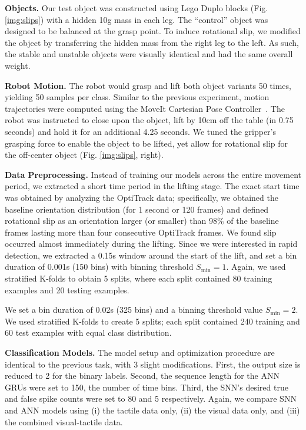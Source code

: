 \documentclass[fyp]{socreport}
\begin{document}
\noindent\textbf{Objects.} Our test object was constructed using Lego Duplo
blocks (Fig. \ref{img:slips}) with a hidden 10g mass in each leg. The
``control'' object was designed to be balanced at the grasp point. To induce
rotational slip, we modified the object by transferring the hidden mass from the
right leg to the left. As such, the stable and unstable objects were visually
identical and had the same overall weight.

\vspace{0.3em}
\noindent\textbf{Robot Motion.} The robot would grasp and lift both object
variants 50 times, yielding 50 samples per class. Similar to the previous
experiment, motion trajectories were computed using the MoveIt Cartesian Pose
Controller~\cite{coleman2014reducing}. The robot was instructed to close upon
the object, lift by 10cm off the table (in 0.75 seconds) and hold it for an
additional 4.25 seconds. We tuned the gripper's grasping force to enable the
object to be lifted, yet allow for rotational slip for the off-center object
(Fig. \ref{img:slips}, right).

\vspace{0.3em}
\noindent\textbf{Data Preprocessing.} Instead of training our models across the
entire movement period, we extracted a short time period in the lifting stage.
The exact start time was obtained by analyzing the OptiTrack data; specifically,
we obtained the baseline orientation distribution (for 1 second or 120 frames)
and defined rotational slip as an orientation larger (or smaller) than 98\% of
the baseline frames lasting more than four consecutive OptiTrack frames. We
found slip occurred almost immediately during the lifting. Since we were
interested in rapid detection, we extracted a 0.15s window around the start of
the lift, and set a bin duration of 0.001s (150 bins) with binning threshold
$S_\text{min} = 1$. Again, we used stratified K-folds to obtain 5 splits, where
each split contained 80 training examples and 20 testing examples.

We set a bin duration of 0.02s (325 bins) and a binning threshold value
$S_{\text{min}} = 2$. We used stratified K-folds to create 5 splits; each split
contained 240 training and 60 test examples with equal class distribution.

\vspace{0.3em}
\noindent\textbf{Classification Models.} The model setup and optimization
procedure are identical to the previous task, with 3 slight modifications.
First, the output size is reduced to 2 for the binary labels. Second, the
sequence length for the ANN GRUs were set to 150, the number of time bins.
Third, the SNN's desired true and false spike counts were set to 80 and 5
respectively. Again, we compare SNN and ANN models using (i) the tactile data
only, (ii) the visual data only, and (iii) the combined visual-tactile data.
\end{document}
